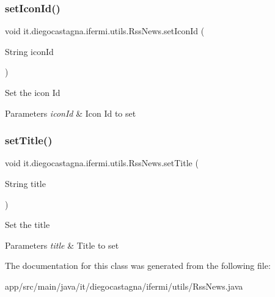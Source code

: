 \subsubsection{\texorpdfstring{setIconId()}{setIconId()}}
{\footnotesize\ttfamily void it.\+diegocastagna.\+ifermi.\+utils.\+Rss\+News.\+set\+Icon\+Id (\begin{DoxyParamCaption}\item[{String}]{icon\+Id }\end{DoxyParamCaption})\hspace{0.3cm}{\ttfamily [inline]}}

Set the icon Id 
\begin{DoxyParams}{Parameters}
{\em icon\+Id} & Icon Id to set \\
\hline
\end{DoxyParams}
\mbox{\label{classit_1_1diegocastagna_1_1ifermi_1_1utils_1_1_rss_news_a22cb25c50472d9f27b6fb24af94f2605}} 
\subsubsection{\texorpdfstring{setTitle()}{setTitle()}}
{\footnotesize\ttfamily void it.\+diegocastagna.\+ifermi.\+utils.\+Rss\+News.\+set\+Title (\begin{DoxyParamCaption}\item[{String}]{title }\end{DoxyParamCaption})\hspace{0.3cm}{\ttfamily [inline]}}

Set the title 
\begin{DoxyParams}{Parameters}
{\em title} & Title to set \\
\hline
\end{DoxyParams}


The documentation for this class was generated from the following file\+:\begin{DoxyCompactItemize}
\item 
app/src/main/java/it/diegocastagna/ifermi/utils/Rss\+News.\+java\end{DoxyCompactItemize}
